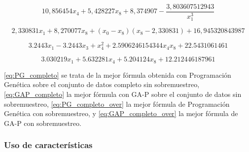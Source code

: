 \begin{equation} \label{eq:PG_completo}
10,856454 x_{4} + 5,428227 x_{8} + 8,374907 - \frac{3,803607512943}{x_{1}^{3}}
\end{equation}


\begin{equation} \label{eq:GAP_completo}
2,330831 x_{1} + 8,270077 x_{8} + \left(x_{0} - x_{8}\right) \left(x_{8} - 2,330831\right) + 16,945320843987
\end{equation}


\begin{equation} \label{eq:PG_completo_over}
3.2443 x_{1} - 3.2443 x_{3} + x_{4}^{2} + 2.5906246154344 x_{4} x_{8} + 22.5431061461
\end{equation}


\begin{equation} \label{eq:GAP_completo_over}
3.030219 x_{1} + 5.632281 x_{4} + 5.204124 x_{8} + 12.212446187961
\end{equation}

\ref{eq:PG_completo} se trata de la mejor fórmula obtenida con Programación Genética sobre el conjunto de datos completo sin sobremuestreo, \ref{eq:GAP_completo} la mejor fórmula con GA-P sobre el conjunto de datos sin sobremuestreo, \ref{eq:PG_completo_over} la mejor fórmula de Programación Genética con sobremuestreo, y \ref{eq:GAP_completo_over} la mejor fórmula de GA-P con sobremuestreo.

\subsubsection{Uso de características}






\newpage

